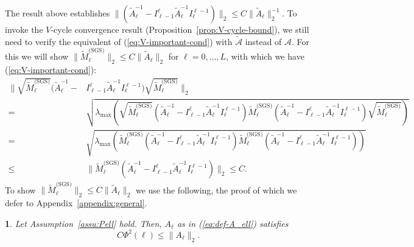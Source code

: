 \documentclass[11pt,english]{article}
\theoremstyle{plain}
\theoremstyle{plain}
\theoremstyle{plain}
\newtheorem{lem}[thm]{\protect\lemmaname}
\theoremstyle{plain}
\numberwithin{equation}{section}
\providecommand{\lemmaname}{Lemma}
\begin{document}
The result above establishes $\|(\widetilde{A}_{\ell}^{-1}-I_{\ell-1}^{\ell}\widetilde{A}_{\ell}^{-1}I_{\ell}^{\ell-1})\|_{2}\leq C\|\widetilde{A}_{\ell}\|_{2}^{-1}$.
To invoke the $V$-cycle convergence result (Proposition~\ref{prop:V-cycle-bound}),
we still need to verify the equivalent of (\ref{eq:V-important-cond}) with $\widetilde{\mathcal{A}}$ instead of $\mathcal{A}$. For this we
will show $\|\widetilde{M}_{\ell}^{\text{(SGS)}}\|_{2}\leq C\|\widetilde{A}_{\ell}\|_{2}$
for $\ell=0,\dots,L$, with which we have (\ref{eq:V-important-cond}):
\begin{align*}
	\|\sqrt{\widetilde{M}_{\ell}^{\text{(SGS)}}}(\widetilde{A}_{\ell}^{-1}- & I_{\ell-1}^{\ell}\widetilde{A}_{\ell}^{-1}I_{\ell}^{\ell-1})\sqrt{\widetilde{M}_{\ell}^{\text{(SGS)}}}\|_{2}                                                                                                                                                                                                                                    \\
	=                                                                       & \sqrt{\lambda_{\mathrm{max}}\left(\sqrt{\widetilde{M}_{\ell}^{\text{(SGS)}}}(\widetilde{A}_{\ell}^{-1}-I_{\ell-1}^{\ell}\widetilde{A}_{\ell}^{-1}I_{\ell}^{\ell-1})\widetilde{M}_{\ell}^{\text{(SGS)}}(\widetilde{A}_{\ell}^{-1}-I_{\ell-1}^{\ell}\widetilde{A}_{\ell}^{-1}I_{\ell}^{\ell-1})\sqrt{\widetilde{M}_{\ell}^{\text{(SGS)}}}\right)} \\
	=                                                                       & \sqrt{\lambda_{\mathrm{max}}\left(\widetilde{M}_{\ell}^{\text{(SGS)}}(\widetilde{A}_{\ell}^{-1}-I_{\ell-1}^{\ell}\widetilde{A}_{\ell}^{-1}I_{\ell}^{\ell-1})\widetilde{M}_{\ell}^{\text{(SGS)}}(\widetilde{A}_{\ell}^{-1}-I_{\ell-1}^{\ell}\widetilde{A}_{\ell}^{-1}I_{\ell}^{\ell-1})\right)}                                                  \\
	\leq                                                                    & \|\widetilde{M}_{\ell}^{\text{(SGS)}}(\widetilde{A}_{\ell}^{-1}-I_{\ell-1}^{\ell}\widetilde{A}_{\ell}^{-1}I_{\ell}^{\ell-1})\|_{2}\leq C.
\end{align*}
To show $\|\widetilde{M}_{\ell}^{\text{(SGS)}}\|_{2}\leq C\|\widetilde{A}_{\ell}\|_{2}$
we use the following,  the proof of which we defer to Appendix~\ref{appendix:general}.
\begin{lem}
	\label{lem:Aell-lb}Let Assumption~\ref{assu:Pell} hold. Then, $A_{\ell}$
	as in (\ref{eq:def-A_ell}) satisfies
	\[C\Phi^{2}(\ell)\leq\|A_{\ell}\|_{2}.\]
\end{lem}
\end{document}
